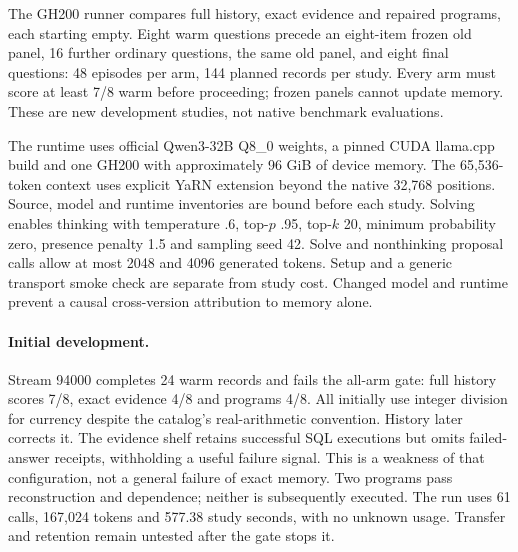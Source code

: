 The GH200 runner compares full history, exact evidence and repaired programs,
each starting empty. Eight warm questions precede an eight-item frozen old
panel, 16 further ordinary questions, the same old panel, and eight final
questions: 48 episodes per arm, 144 planned records per study. Every arm must
score at least 7/8 warm before proceeding; frozen panels cannot update memory.
These are new development studies, not native benchmark evaluations.

The runtime uses official Qwen3-32B Q8\_0 weights, a pinned CUDA llama.cpp build
and one GH200 with approximately 96 GiB of device memory. The 65,536-token
context uses explicit YaRN extension beyond the native 32,768 positions. Source,
model and runtime inventories are bound before each study. Solving enables
thinking with temperature .6, top-$p$ .95, top-$k$ 20, minimum probability zero,
presence penalty 1.5 and sampling seed 42. Solve and nonthinking proposal calls
allow at most 2048 and 4096 generated tokens. Setup and a generic transport smoke
check are separate from study cost. Changed model and runtime prevent a causal
cross-version attribution to memory alone.

\begin{table}[t]
\centering\small\setlength{\tabcolsep}{3pt}

\caption{GH200 development receipts. These adaptive studies are separate
configurations. Counts include failures, checks and the final interrupted
follow-up episode; only 65 of its 66 saved records complete. The program arm's
follow-up tokens exclude one call with unknown usage. Lower costs at unequal
accuracy do not establish matched-accuracy efficiency.}
\label{tab:gh200cost}
\end{table}

\paragraph{Initial development.}
Stream 94000 completes 24 warm records and fails the all-arm gate: full history
scores 7/8, exact evidence 4/8 and programs 4/8. All initially use integer
division for currency despite the catalog's real-arithmetic convention. History
later corrects it. The evidence shelf retains successful SQL executions but
omits failed-answer receipts, withholding a useful failure signal. This is a
weakness of that configuration, not a general failure of exact memory. Two
programs pass reconstruction and dependence; neither is subsequently executed.
The run uses 61 calls, 167,024 tokens and 577.38 study seconds, with no unknown
usage. Transfer and retention remain untested after the gate stops it.


